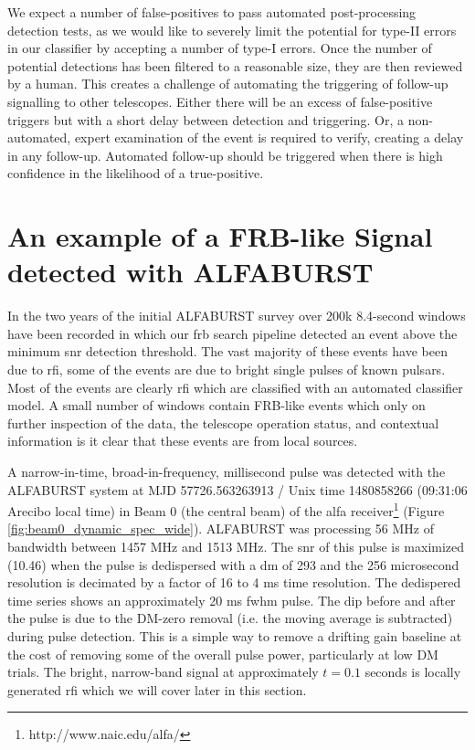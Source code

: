 \documentclass[a4paper,fleqn,usenatbib]{mnras}
\begin{document}
We expect a number of false-positives to pass automated post-processing detection
tests, as we would like to severely limit the potential for type-II errors in
our classifier by accepting a number of type-I errors. Once the number of
potential detections has been filtered to a reasonable size, they are then
reviewed by a human. This creates a challenge of automating the triggering of
follow-up signalling to other telescopes. Either there will be an excess of
false-positive triggers but with a short delay between detection and triggering.
Or, a non-automated, expert examination of the event is required to verify,
creating a delay in any follow-up. Automated follow-up should be triggered when
there is high confidence in the likelihood of a true-positive.

\section{An example of a FRB-like Signal detected with ALFABURST}
\label{sec:D20161204}

In the two years of the initial ALFABURST survey \citep{2017ApJS..228...21C} over
200k 8.4-second windows have been recorded in which our \gls{frb} search pipeline
detected an event above the minimum \gls{snr} detection threshold. The vast
majority of these events have been due to \gls{rfi}, some of the events are due
to bright single pulses of known pulsars. Most of the events are
clearly \gls{rfi} which are classified with an automated classifier model. A
small number of windows contain FRB-like events which only on further inspection
of the data, the telescope operation status, and contextual information is it
clear that these events are from local sources.

A narrow-in-time, broad-in-frequency, millisecond pulse was detected with the
ALFABURST system at MJD 57726.563263913 / Unix time 1480858266 (09:31:06 Arecibo
local time) in Beam 0 (the central beam) of the \gls{alfa}
receiver\footnote{http://www.naic.edu/alfa/} (Figure
\ref{fig:beam0_dynamic_spec_wide}). ALFABURST was processing 56 MHz of bandwidth
between 1457 MHz and 1513 MHz. The \gls{snr} of this pulse is maximized (10.46)
when the pulse is dedispersed with a \gls{dm} of 293 and the 256 microsecond
resolution is decimated by a factor of 16 to 4 ms time resolution. The
dedispered time series shows an approximately 20 ms \gls{fwhm} pulse. The dip
before and after the pulse is due to the DM-zero removal (i.e. the moving
average is subtracted) during pulse detection. This is a simple way to remove a
drifting gain baseline at the cost of removing some of the overall pulse power,
particularly at low DM trials. The bright, narrow-band signal at approximately
$t=0.1$ seconds is locally generated \gls{rfi} which we will cover later in this
section.
\end{document}
